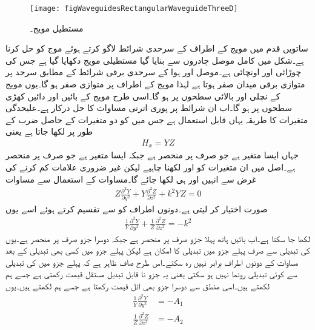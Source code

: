 \begin{figure}
\centering
\texttt{[image: figWaveguidesRectangularWaveguideThreeD]}
\caption{مستطیل مویج۔}
\label{شکل_مویج_مستطیل_مویج_اطراف}
\end{figure}
ساتویں قدم میں مویج کے اطراف کے سرحدی شرائط لاگو کرتے ہوئے موج کو حل کرنا ہے۔شکل  میں کامل موصل چادروں سے بنایا گیا مستطیلی مویج دکھایا گیا ہے جس کی چوڑائی  اور اونچائی  ہے۔موصل اور ہوا کے سرحدی برقی شرائط کے مطابق سرحد پر متوازی برقی میدان صفر ہوتا ہے لہٰذا مویج کے اطراف پر متوازی  صفر ہو گا۔یوں مویج کے نچلی اور  بالائی سطحوں پر  ہو گا۔اسی طرح مویج کے بائیں اور دائیں کھڑی سطحوں پر  ہو گا۔اب ان شرائط پر پوری اترتی مساوات  کا حل درکار ہے۔علیحدگی متغیرات کا طریقہ یہاں قابل استعمال ہے جس میں  کو دو متغیرات کے حاصل ضرب کے طور پر لکھا جاتا ہے یعنی
\begin{align}\label{مساوات_مویج_علیحدگی_متغیرات}
H_x=Y Z
\end{align}
جہاں  ایسا متغیر ہے جو صرف  پر منحصر ہے جبکہ  ایسا متغیر ہے جو صرف  پر منحصر ہے۔اصل میں ان متغیرات کو  اور  لکھنا چاہیے لیکن غیر ضروری علامات کم کرنے کی غرض سے انہیں  اور  ہی لکھا جائے گا۔مساوات   کے استعمال سے مساوات 
\begin{align}
Z \frac{\partial^2 Y}{\partial y^2}+Y \frac{\partial^2 Z}{\partial z^2}+k^2 Y Z =0
\end{align}
صورت اختیار کر لیتی ہے۔دونوں اطراف کو  سے تقسیم کرتے ہوئے اسے یوں
\begin{align}\label{مساوات_مویج_س}
\frac{1}{Y}\frac{\partial^2 Y}{\partial y^2}+\frac{1}{Z} \frac{\partial^2 Z}{\partial z^2}=-k^2
\end{align}
لکھا جا سکتا ہے۔اب بائیں ہاتھ پہلا جزو صرف  پر منحصر ہے  جبکہ دوسرا جزو صرف  پر منحصر ہے۔یوں  کی تبدیلی سے صرف پہلے جزو میں تبدیلی کا امکان ہے لیکن پہلے جزو میں کسی بھی تبدیلی کے بعد مساوات کے دونوں اطراف برابر نہیں رہ سکتے۔اس طرح صاف ظاہر ہے کہ پہلے جزو میں  کی تبدیلی سے کوئی تبدیلی رونما نہیں ہو سکتی یعنی یہ جزو نا قابل تبدیل مستقل قیمت رکھتی ہے جسے ہم  لکھتے ہیں۔اسی منطق سے دوسرا جزو بھی اٹل قیمت رکھتا ہے جسے ہم  لکھتے ہیں۔یوں
\begin{align}
\frac{1}{Y}\frac{\partial^2 Y}{\partial y^2}&=-A_1 \label{مساوات_مویج_ش}\\
\frac{1}{Z} \frac{\partial^2 Z}{\partial z^2}&=-A_2 \label{مساوات_مویج_ص}
\end{align} 
